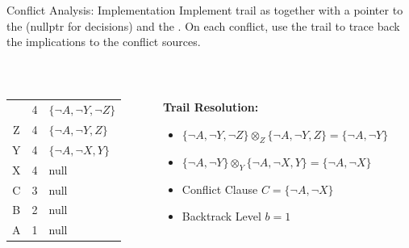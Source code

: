 \documentclass[t]{sdqbeamer}
\begin{document}
\begin{frame}{Conflict Analysis: Implementation}
Implement trail as  together with a pointer to the  (nullptr for decisions) and the . On each conflict, use the trail to trace back the implications to the conflict sources.
\begin{example}
~\\[1ex]
\begin{columns}[T]
\begin{column}{.3\linewidth}
	\begin{tabular}{ccl}
	\blitz & 4 & $\{\lnot A, \lnot Y, \lnot Z \}$ \\
	Z & 4 & $\{\lnot A, \lnot Y, Z \}$ \\
	Y & 4 & $\{\lnot A, \lnot X, Y \}$ \\
	X & 4 & null\\
	C & 3 & null\\
	B & 2 & null\\
	A & 1 & null\\
	\end{tabular}
\end{column}
\begin{column}{.6\linewidth}
	\textbf{Trail Resolution:}
	\setlength{\leftmargini}{1em}
	\begin{itemize}\setlength{\itemsep}{1ex}
	\item $\{\lnot A, \lnot Y, \lnot Z\}\!\otimes_Z\!\{\lnot A, \lnot Y, Z\}\!=\!\{\lnot A, \lnot Y\}$
	\item $\{\lnot A, \lnot Y\}\!\otimes_Y\!\{\lnot A, \lnot X, Y \}\!=\!\{\lnot A, \lnot X\}$
	\item Conflict Clause $C = \{\lnot A, \lnot X\}$
	\item Backtrack Level $b = 1$
	\end{itemize} 
\end{column}
\end{columns}
\end{example}
\end{frame}
\end{document}
